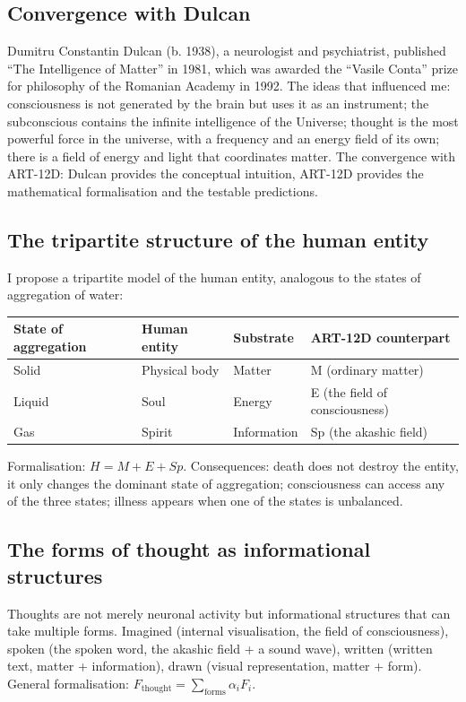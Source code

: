 \documentclass[11pt,a4paper]{article}
\begin{document}
\subsection{Convergence with Dulcan}
Dumitru Constantin Dulcan (b. 1938), a neurologist and psychiatrist, published ``The Intelligence of Matter'' in 1981, which was awarded the ``Vasile Conta'' prize for philosophy of the Romanian Academy in 1992. The ideas that influenced me: consciousness is not generated by the brain but uses it as an instrument; the subconscious contains the infinite intelligence of the Universe; thought is the most powerful force in the universe, with a frequency and an energy field of its own; there is a field of energy and light that coordinates matter. The convergence with ART-12D: Dulcan provides the conceptual intuition, ART-12D provides the mathematical formalisation and the testable predictions.

\subsection{The tripartite structure of the human entity}
I propose a tripartite model of the human entity, analogous to the states of aggregation of water:
\begin{table}[H]
\centering
\begin{tabular}{@{}llll@{}}
\toprule
\textbf{State of aggregation} & \textbf{Human entity} & \textbf{Substrate} & \textbf{ART-12D counterpart} \\ \midrule
Solid & Physical body & Matter & M (ordinary matter) \\
Liquid & Soul & Energy & E (the field of consciousness) \\
Gas & Spirit & Information & Sp (the akashic field) \\ \bottomrule
\end{tabular}
\end{table}
Formalisation: $H = M + E + Sp$. Consequences: death does not destroy the entity, it only changes the dominant state of aggregation; consciousness can access any of the three states; illness appears when one of the states is unbalanced.

\subsection{The forms of thought as informational structures}
Thoughts are not merely neuronal activity but informational structures that can take multiple forms. Imagined (internal visualisation, the field of consciousness), spoken (the spoken word, the akashic field + a sound wave), written (written text, matter + information), drawn (visual representation, matter + form). General formalisation: $F_{\text{thought}} = \sum_{\text{forms}} \alpha_i F_i$.
\end{document}
